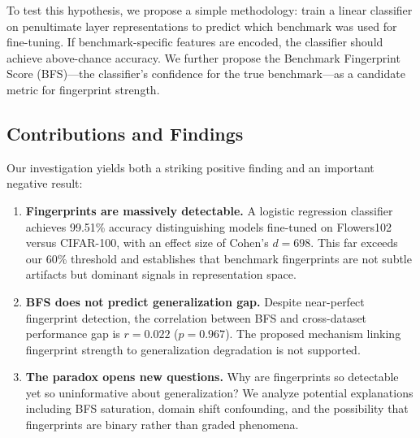 To test this hypothesis, we propose a simple methodology: train a linear classifier on penultimate layer representations to predict which benchmark was used for fine-tuning. If benchmark-specific features are encoded, the classifier should achieve above-chance accuracy. We further propose the Benchmark Fingerprint Score (BFS)---the classifier's confidence for the true benchmark---as a candidate metric for fingerprint strength.

\subsection{Contributions and Findings}

Our investigation yields both a striking positive finding and an important negative result:

\begin{enumerate}
    \item \textbf{Fingerprints are massively detectable.} A logistic regression classifier achieves 99.51\% accuracy distinguishing models fine-tuned on Flowers102 versus CIFAR-100, with an effect size of Cohen's $d = 698$. This far exceeds our 60\% threshold and establishes that benchmark fingerprints are not subtle artifacts but dominant signals in representation space.

    \item \textbf{BFS does not predict generalization gap.} Despite near-perfect fingerprint detection, the correlation between BFS and cross-dataset performance gap is $r = 0.022$ ($p = 0.967$). The proposed mechanism linking fingerprint strength to generalization degradation is not supported.

    \item \textbf{The paradox opens new questions.} Why are fingerprints so detectable yet so uninformative about generalization? We analyze potential explanations including BFS saturation, domain shift confounding, and the possibility that fingerprints are binary rather than graded phenomena.
\end{enumerate}
